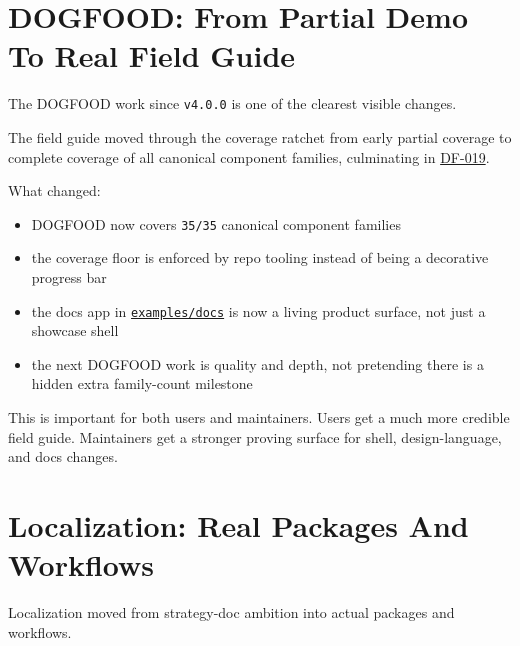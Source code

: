 \section{DOGFOOD: From Partial Demo To Real Field Guide}\label{record-275-dogfood-from-partial-demo-to-real-field-guide}

The DOGFOOD work since \texttt{v\allowbreak{}4\allowbreak{}.\allowbreak{}0\allowbreak{}.\allowbreak{}0} is one of the clearest visible changes.

The field guide moved through the coverage ratchet from early partial coverage to complete coverage of all canonical component families, culminating in \href{https://github.com/flyingrobots/bijou/blob/cbd70612140e7a450d764b3c7be1c6af878b99bc/docs/design/DF-019-raise-dogfood-coverage-floor-to-100-percent.md}{DF-019}.

What changed:

\begin{itemize}
\tightlist
\item
  DOGFOOD now covers \texttt{3\allowbreak{}5\allowbreak{}/\allowbreak{}3\allowbreak{}5} canonical component families
\item
  the coverage floor is enforced by repo tooling instead of being a decorative progress bar
\item
  the docs app in \href{https://github.com/flyingrobots/bijou/blob/cbd70612140e7a450d764b3c7be1c6af878b99bc/examples/docs/README.md}{\texttt{e\allowbreak{}x\allowbreak{}a\allowbreak{}m\allowbreak{}p\allowbreak{}l\allowbreak{}e\allowbreak{}s\allowbreak{}/\allowbreak{}d\allowbreak{}o\allowbreak{}c\allowbreak{}s}} is now a living product surface, not just a showcase shell
\item
  the next DOGFOOD work is quality and depth, not pretending there is a hidden extra family-count milestone
\end{itemize}

This is important for both users and maintainers. Users get a much more credible field guide. Maintainers get a stronger proving surface for shell, design-language, and docs changes.

\section{Localization: Real Packages And Workflows}\label{record-275-localization-real-packages-and-workflows}

Localization moved from strategy-doc ambition into actual packages and workflows.

